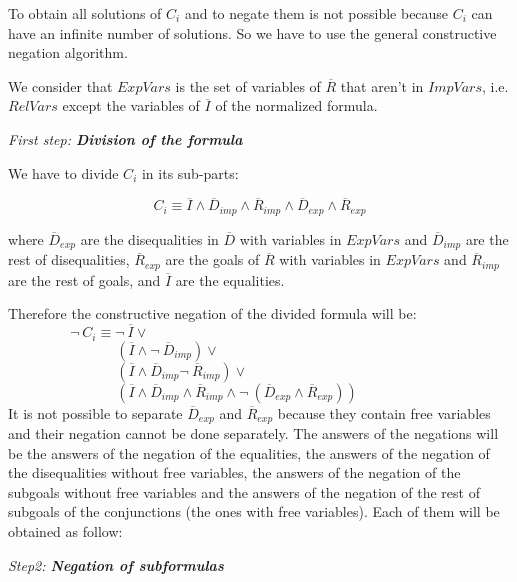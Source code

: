 \documentclass{llncs}
\begin{document}
To obtain all solutions of $C_i$ and to negate them is not possible
because $C_i$ can have an infinite number of solutions. So we have to
use the general constructive negation algorithm.  

We consider that $ExpVars$ is the set of variables of $\overline{R}$
that aren't in $ImpVars$, i.e. $RelVars$ except the variables of
$\overline{I}$ of the normalized formula.
\medskip

\noindent
{\em First step: {\bf Division of the formula}}

\noindent
We have to divide $C_i$ in its sub-parts:

\[C_i \equiv \overline{I} \wedge
        \overline{D}_{imp} \wedge \overline{R}_{imp} \wedge
        \overline{D}_{exp} \wedge \overline{R}_{exp} \]

\noindent
where $\overline{D}_{exp}$ are the disequalities in $\overline{D}$
with variables in $ExpVars$ and $\overline{D}_{imp}$ are the rest of
disequalities, $\overline{R}_{exp}$ are the goals of $\overline{R}$
with variables in $ExpVars$ and $\overline{R}_{imp}$ are the rest of
goals, and $\overline{I}$ are the equalities.

Therefore the constructive negation of the divided formula will be: \\

$~~~~~~~~~~~~~~~~~~~~\neg~C_i \equiv \neg~\overline{I} \vee $ \\
$~~~~~~~~~~~~~~~~~~~~~~~~~~~~~~~~~~~(\overline{I} \wedge \neg~\overline{D}_{imp}) \vee  $ \\
$~~~~~~~~~~~~~~~~~~~~~~~~~~~~~~~~~~~(\overline{I} \wedge \overline{D}_{imp} \neg~\overline{R}_{imp}) \vee $ \\
$~~~~~~~~~~~~~~~~~~~~~~~~~~~~~~~~~~~( \overline{I} \wedge \overline{D}_{imp} \wedge \overline{R}_{imp} \wedge \neg~(\overline{D}_{exp} \wedge \overline{R}_{exp})) $ \\

It is not possible to separate $\overline{D}_{exp}$ and
$\overline{R}_{exp}$ because they contain free variables and
their negation cannot be done separately. The answers of the negations
will be the answers of the negation of the equalities, the answers of
the negation of the disequalities without free variables, the answers
of the negation of the subgoals without free variables and the answers
of the negation of the rest of subgoals of the conjunctions (the ones
with free variables). Each of them will be obtained as follow:
\medskip

\noindent
{\em Step2: {\bf Negation of subformulas}}
\end{document}
